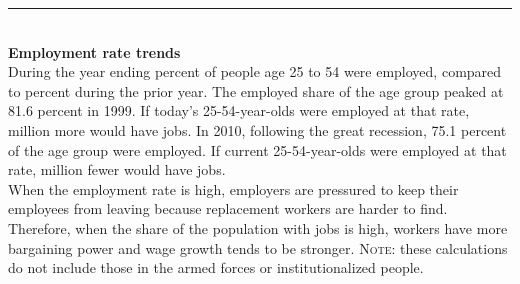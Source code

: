 \documentclass{report}
\newcommand{\dateaxisticks}{
		axis line style={draw=none},
		max space between ticks=38,	 
		xmin={1997-01-01},
		xtick={{1995-01-01}, {2000-01-01}, {2005-01-01}, {2010-01-01}, {2015-01-01}},
	    minor xtick={
	    	{1994-01-01}, {1996-01-01}, {1997-01-01}, {1998-01-01}, {1999-01-01},
			{2001-01-01}, {2002-01-01}, {2003-01-01}, {2004-01-01}, 
	    	{2006-01-01}, {2007-01-01}, {2008-01-01}, {2009-01-01},
	      	{2011-01-01}, {2012-01-01}, {2013-01-01}, {2014-01-01},
	      	{2016-01-01}, {2017-01-01}, {2018-01-01}, {2019-01-01}},
	    enlarge y limits={0.08},
	    enlarge x limits={0.12},}
\newcommand{\lastpt}[1]{node[circle, 
		minimum size=3pt, inner sep=0pt, draw, fill, pos=1](#1){};}
\begin{document}
\noindent \begin{minipage}[t]{0.48\textwidth}

\noindent \textcolor{blue}{\rule[-6pt]{90mm}{24pt}}
		\vspace{-6mm}
		
		\hspace{1mm} \textcolor{white}{}
\vspace{1.1mm}

\hspace{0.8mm} 
\vspace{4mm}\\
\textbf{Employment rate trends}
\vspace{2mm}\\
During the year ending percent of people age 25 to 54 were employed, compared to percent during the prior year. The employed share of the age group peaked at 81.6 percent in 1999. If today's 25-54-year-olds were employed at that rate, million more would have jobs. In 2010, following the great recession, 75.1 percent of the age group were employed. If current 25-54-year-olds were employed at that rate, million fewer would have jobs.\\

When the employment rate is high, employers are pressured to keep their employees from leaving because replacement workers are harder to find. Therefore, when the share of the population with jobs is high, workers have more bargaining power and wage growth tends to be stronger. \textsc{Note:} these calculations do not include those in the armed forces or institutionalized people.\\
\end{minipage}\hfill
\end{document}
